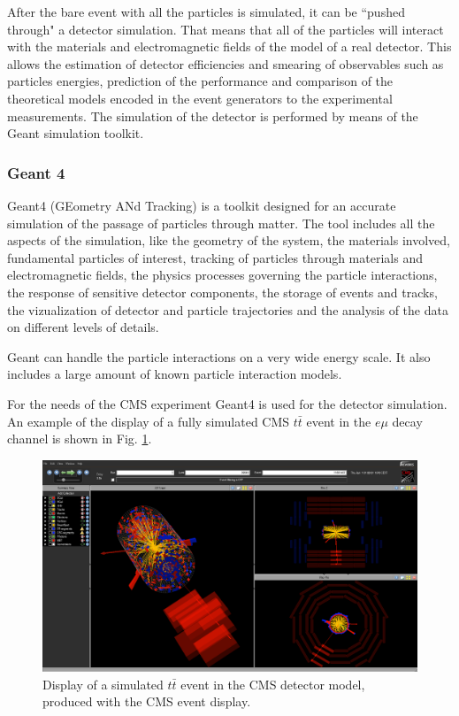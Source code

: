 After the bare event with all the particles is simulated, it can be ``pushed through" a detector simulation. That means that all of the particles 
will interact with the materials and electromagnetic fields of the model of a real detector. This allows the estimation of 
detector efficiencies and smearing of observables such as particles energies, prediction of the performance and comparison of the theoretical 
models encoded in the event generators to
the experimental measurements. The simulation of the detector is performed by means of the Geant simulation toolkit.

\subsubsection{Geant 4}

Geant4 (GEometry ANd Tracking) \cite{Agostinelli:2002hh} is a toolkit designed for an accurate simulation of the passage of particles through matter.
The tool includes all the aspects of the simulation, like the geometry of the system, the materials involved, fundamental particles of interest,
tracking of particles through materials and electromagnetic fields, the physics processes governing the particle interactions, the response of
sensitive detector components, the storage of events and tracks, the vizualization of detector and particle trajectories and the analysis of
the data on different levels of details.

Geant can handle the particle interactions on a very wide energy scale. It also includes a large amount of known particle interaction models.

For the needs of the CMS experiment Geant4 is used for the detector simulation. An example of the display of a fully simulated CMS $t\bar{t}$ event
in the $e\mu$ decay channel is shown in Fig. \ref{fig:Evt_display}.

 \begin{figure}
  \centering
  \includegraphics[width=1.0\textwidth]{03_simulation/plots/eventDisplay-39649-11661467.png}
  \caption{Display of a simulated $t\bar{t}$ event in the CMS detector model, produced with the CMS event display.}
  \label{fig:Evt_display}
 \end{figure}